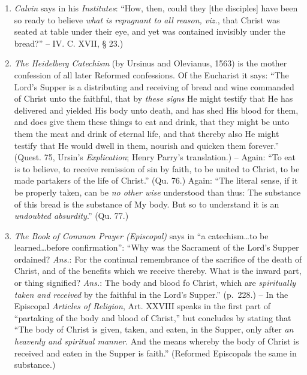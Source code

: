 \documentclass[
]{book}
\begin{document}
\begin{enumerate}
\def\labelenumi{\arabic{enumi}.}
\setcounter{enumi}{1}
\item
  \emph{Calvin} says in his \emph{Institutes}: ``How, then, could they {[}the disciples{]} have been so ready to believe \emph{what is repugnant to all reason, viz.}, that Christ was seated at table under their eye, and yet was contained invisibly under the bread?'' -- IV. C. XVII, § 23.)
\item
  \emph{The Heidelberg Catechism} (by Ursinus and Olevianus, 1563) is the mother confession of all later Reformed confessions. Of the Eucharist it says: ``The Lord's Supper is a distributing and receiving of bread and wine commanded of Christ unto the faithful, that by \emph{these signs} He might testify that He has delivered and yielded His body unto death, and has shed His blood for them, and does give them these things to eat and drink, that they might be unto them the meat and drink of eternal life, and that thereby also He might testify that He would dwell in them, nourish and quicken them forever.'' (Quest. 75, Ursin's \emph{Explication}; Henry Parry's translation.) -- Again: ``To eat is to believe, to receive remission of sin by faith, to be united to Christ, to be made partakers of the life of Christ.'' (Qu. 76.) Again: ``The literal sense, if it be properly taken, can be \emph{no other wise} understood than thus: The substance of this bread is the substance of My body. But so to understand it is an \emph{undoubted absurdity}.'' (Qu. 77.)
\item
  \emph{The Book of Common Prayer (Episcopal)} says in ``a catechism\ldots to be learned\ldots before confirmation'': ``Why was the Sacrament of the Lord's Supper ordained? \emph{Ans.}: For the continual remembrance of the sacrifice of the death of Christ, and of the benefits which we receive thereby. What is the inward part, or thing signified? \emph{Ans.}: The body and blood fo Christ, which are \emph{spiritually taken and received} by the faithful in the Lord's Supper.'' (p.~228.) -- In the Episcopal \emph{Articles of Religion}, Art. XXVIII speaks in the first part of ``partaking of the body and blood of Christ,'' but concludes by stating that ``The body of Christ is given, taken, and eaten, in the Supper, only after \emph{an heavenly and spiritual manner}. And the means whereby the body of Christ is received and eaten in the Supper is faith.'' (Reformed Episcopals the same in substance.)

\end{enumerate}
\end{document}
